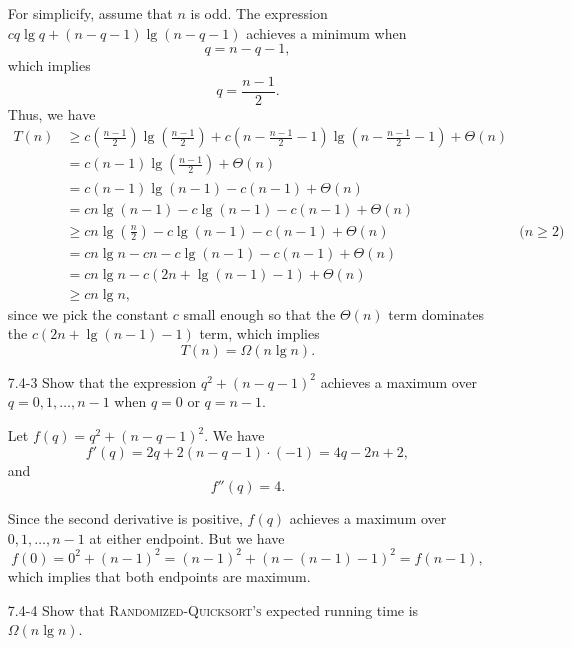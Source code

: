 \documentclass{report}
\makeatletter
\renewenvironment{framed}{%
 \def\FrameCommand##1{\hskip\@totalleftmargin
 \fboxsep=\FrameSep\fbox{##1}}%
 \MakeFramed {\advance\hsize-\width
   \@totalleftmargin\z@ \linewidth\hsize
   \@setminipage}}%
 {\par\unskip\endMakeFramed}
\makeatother
\begin{document}
\begin{enumerate}
\begin{framed}
For simplicify, assume that $n$ is odd. The expression $c q \lg q + (n - q - 1)
\lg (n - q - 1)$ achieves a minimum when
\[
  q = n - q - 1,
\]
which implies
\[
  q = \frac{n - 1}{2}.
\]
Thus, we have
\begin{equation*}
\begin{aligned}
  T(n) &\ge c \left(\frac{n - 1}{2}\right) \lg \left(\frac{n - 1}{2}\right) +
            c\left(n - \frac{n - 1}{2} - 1\right) \lg \left(n - \frac{n - 1}{2} - 1\right) + \Theta(n)\\
       &= c(n - 1) \lg \left(\frac{n - 1}{2}\right) + \Theta(n)\\
       &= c(n - 1) \lg (n - 1) - c(n - 1) + \Theta(n)\\
       &= cn \lg (n - 1) - c \lg (n - 1) - c (n - 1) + \Theta(n)\\
       &\ge cn \lg \left(\frac{n}{2}\right) - c \lg (n - 1) - c(n - 1) + \Theta(n) & \text{($n \ge 2$)}\\
       &= cn \lg n - cn - c \lg (n - 1) - c(n - 1) + \Theta(n)\\
       &= cn \lg n - c (2n + \lg (n - 1) - 1) + \Theta(n)\\
       &\ge cn \lg n,
\end{aligned}
\end{equation*}
since we pick the constant $c$ small enough so that the $\Theta(n)$ term
dominates the $c(2n + \lg (n - 1) - 1)$ term, which implies
\[
  T(n) = \Omega(n \lg n).
\]
\end{framed}

\item[7.4{-}3]{Show that the expression $q^2 + (n - q - 1)^2$ achieves a maximum
over $q = 0, 1, \dots, n - 1$ when $q = 0$ or $q = n - 1$.}

\begin{framed}
Let $f(q) = q^2 + (n - q - 1)^2$. We have
\[
  f'(q) = 2q + 2(n - q - 1) \cdot (-1) = 4q -2n + 2,
\]
and
\[
  f''(q) = 4.
\]

Since the second derivative is positive, $f(q)$ achieves a maximum over $0, 1,
\dots, n - 1$ at either endpoint. But we have
\[
  f(0) = 0^2 + (n - 1)^2 = (n - 1)^2 + (n - (n - 1) - 1)^2 = f(n - 1),
\]
which implies that both endpoints are maximum.
\end{framed}

\item[7.4{-}4]{Show that \textsc{Randomized-Quicksort's} expected running time
is $\Omega(n \lg n)$.}


\end{enumerate}
\end{document}
